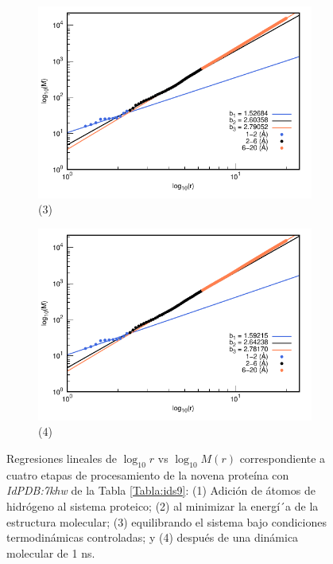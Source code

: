 \begin{figure}[H]
	\vspace{0cm} %
	
	\hspace{-0.3cm} 
	\begin{subfigure}{0.49\textwidth}
		\centering
		\includegraphics[width=\linewidth,page=1]{graphs/PDBs/7khw/7khwEq.pdf}
		\caption{(3)}
	\end{subfigure}
	\hspace{0.2cm}
	\begin{subfigure}{0.49\textwidth} %
		\centering
		\includegraphics[width=\linewidth,page=1]{graphs/PDBs/7khw/7khw1ns.pdf}
		\caption{(4)}
	\end{subfigure}
	\caption{Regresiones lineales de $\log_{10}r$ vs $\log_{10}M(r)$ correspondiente a cuatro etapas de procesamiento de la novena prote\'{i}na con \textit{IdPDB:7khw} de la Tabla \ref{Tabla:ids9}: (1) Adici\'{o}n de \'{a}tomos de hidr\'{o}geno al sistema proteico; (2) al minimizar la energ\'{i´}a de la estructura molecular; (3) equilibrando el sistema bajo condiciones termodin\'{a}micas controladas; y (4) despu\'{e}s de una din\'{a}mica molecular de 1 ns.}
	\label{fig:7khw}
\end{figure}

